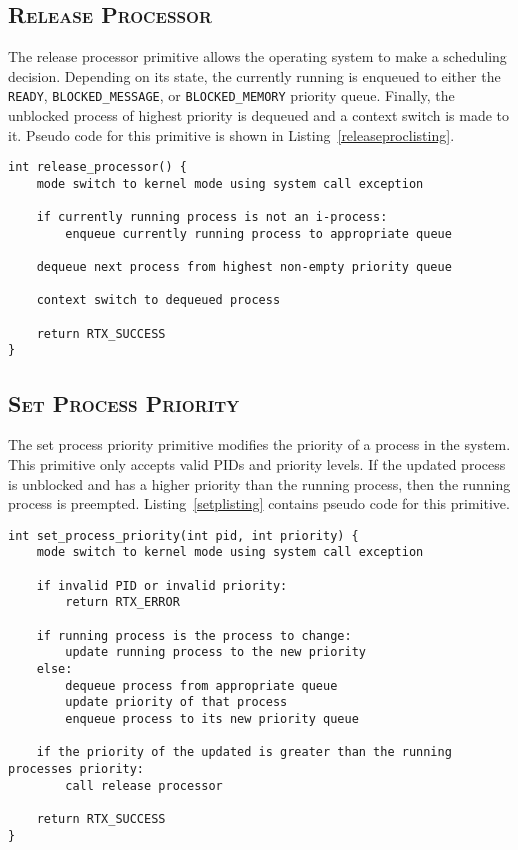 \documentclass[oneside]{report}
\begin{document}
\subsection{\textsc{Release Processor}}
The release processor primitive allows the operating system to make a
scheduling decision. Depending on its state, the currently running is
enqueued to either the \texttt{READY}, \texttt{BLOCKED\_MESSAGE}, or
\texttt{BLOCKED\_MEMORY} priority queue. Finally, the unblocked process
of highest priority is dequeued and a context switch is made to it. Pseudo code 
for this primitive is shown in Listing~\ref{releaseproclisting}.

\begin{lstlisting}
int release_processor() {
    mode switch to kernel mode using system call exception

    if currently running process is not an i-process:
        enqueue currently running process to appropriate queue

    dequeue next process from highest non-empty priority queue

    context switch to dequeued process
    
    return RTX_SUCCESS
}
\end{lstlisting}

\subsection{\textsc{Set Process Priority}}

The set process priority primitive modifies the priority of a process
in the system. This primitive only accepts valid PIDs and priority
levels. If the updated process is unblocked and has a higher priority
than the running process, then the running process is
preempted. Listing~\ref{setplisting} contains pseudo code for this
primitive.

\begin{lstlisting}
int set_process_priority(int pid, int priority) {
    mode switch to kernel mode using system call exception
    
    if invalid PID or invalid priority:
        return RTX_ERROR
    
    if running process is the process to change:
        update running process to the new priority
    else:
        dequeue process from appropriate queue
        update priority of that process
        enqueue process to its new priority queue

    if the priority of the updated is greater than the running processes priority:
        call release processor

    return RTX_SUCCESS
}
\end{lstlisting}
\end{document}
